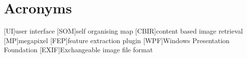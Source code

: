 %
%
%
%
%
%


\chapter*{Acronyms}


\begin{acronym}[TDMA]

[UI]{user interface}
[SOM]{self organising map}
[CBIR]{content based image retrieval}
[MP]{megapixel}
[FEP]{feature extraction plugin}
[WPF]{Windows Presentation Foundation}
[EXIF]{Exchangeable image file format}

\end{acronym}
\vfill

\cleardoublepage